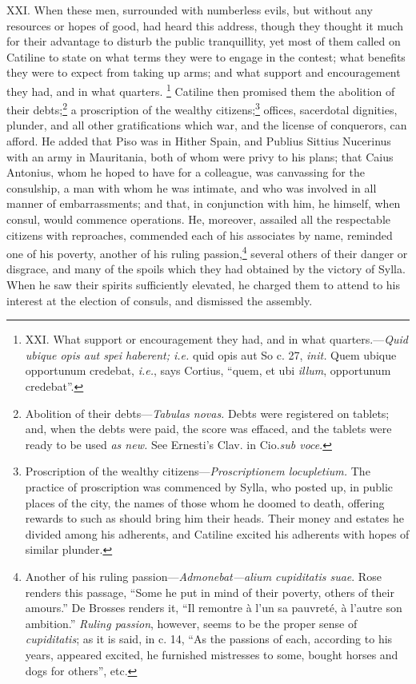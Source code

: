 XXI. When these men, surrounded with numberless evils, but without any
resources or hopes of good, had heard this address, though they
thought it much for their advantage to disturb the public tranquillity,
yet most of them called on Catiline to state on what terms they were to
engage in the contest; what benefits they were to expect from taking up
arms; and what support and encouragement they had, and in what quarters.
\footnote{XXI. What support or encouragement they had, and in what
quarters.—\emph{Quid ubique opis aut spei haberent; i.e.} quid opis aut
So c. 27, \emph{init.} Quem ubique opportunum credebat, \emph{i.e.}, says
Cortius, ``quem, et ubi \emph{illum}, opportunum credebat''.} Catiline then promised them the abolition of their debts;\footnote{Abolition of their debts—\emph{Tabulas novas.} Debts were
registered on tablets; and, when the debts were paid, the score was
effaced, and the tablets were ready to be used \emph{as new.} See Ernesti's
Clav. in Cio.\emph{sub voce}.} a
proscription of the wealthy citizens;\footnote{Proscription of the wealthy citizens—\emph{Proscriptionem
locupletium.} The practice of proscription was commenced by Sylla, who
posted up, in public places of the city, the names of those whom he
doomed to death, offering rewards to such as should bring him their
heads. Their money and estates he divided among his adherents, and
Catiline excited his adherents with hopes of similar plunder.} offices, sacerdotal dignities,
plunder, and all other gratifications which war, and the license of
conquerors, can afford. He added that Piso was in Hither Spain, and
Publius Sittius Nucerinus with an army in Mauritania, both of whom were
privy to his plans; that Caius Antonius, whom he hoped to have for a
colleague, was canvassing for the consulship, a man with whom he was
intimate, and who was involved in all manner of embarrassments; and that,
in conjunction with him, he himself, when consul, would commence
operations. He, moreover, assailed all the respectable citizens with
reproaches, commended each of his associates by name, reminded one of
his poverty, another of his ruling passion,\footnote{Another of his ruling passion—\emph{Admonebat—alium cupiditatis
suae}. Rose renders this passage, ``Some he put in mind of their
poverty, others of their amours.'' De Brosses renders it, ``Il
remontre à l'un sa pauvreté, à l'autre son ambition.'' \emph{Ruling
passion}, however, seems to be the proper sense of \emph{cupiditatis};
as it is said, in c. 14, ``As the passions of each, according to his
years, appeared excited, he furnished mistresses to some, bought
horses and dogs for others'', etc.} several others of their
danger or disgrace, and many of the spoils which they had obtained by
the victory of Sylla. When he saw their spirits sufficiently elevated,
he charged them to attend to his interest at the election of consuls,
and dismissed the assembly.

